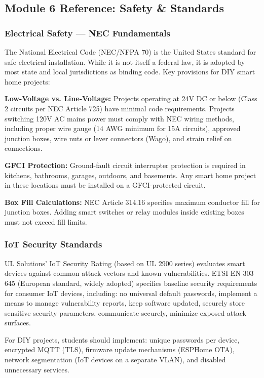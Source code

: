 \documentclass[11pt,letterpaper]{article}
\begin{document}
\subsection{Module 6 Reference: Safety \& Standards}

\subsubsection{Electrical Safety --- NEC Fundamentals}

The National Electrical Code (NEC/NFPA 70) is the United States standard for safe electrical installation. While it is not itself a federal law, it is adopted by most state and local jurisdictions as binding code. Key provisions for DIY smart home projects:

\textbf{Low-Voltage vs. Line-Voltage:} Projects operating at 24V DC or below (Class 2 circuits per NEC Article 725) have minimal code requirements. Projects switching 120V AC mains power must comply with NEC wiring methods, including proper wire gauge (14 AWG minimum for 15A circuits), approved junction boxes, wire nuts or lever connectors (Wago), and strain relief on connections.

\textbf{GFCI Protection:} Ground-fault circuit interrupter protection is required in kitchens, bathrooms, garages, outdoors, and basements. Any smart home project in these locations must be installed on a GFCI-protected circuit.

\textbf{Box Fill Calculations:} NEC Article 314.16 specifies maximum conductor fill for junction boxes. Adding smart switches or relay modules inside existing boxes must not exceed fill limits.

\subsubsection{IoT Security Standards}

UL Solutions' IoT Security Rating (based on UL 2900 series) evaluates smart devices against common attack vectors and known vulnerabilities. ETSI EN 303 645 (European standard, widely adopted) specifies baseline security requirements for consumer IoT devices, including: no universal default passwords, implement a means to manage vulnerability reports, keep software updated, securely store sensitive security parameters, communicate securely, minimize exposed attack surfaces.

For DIY projects, students should implement: unique passwords per device, encrypted MQTT (TLS), firmware update mechanisms (ESPHome OTA), network segmentation (IoT devices on a separate VLAN), and disabled unnecessary services.
\end{document}
